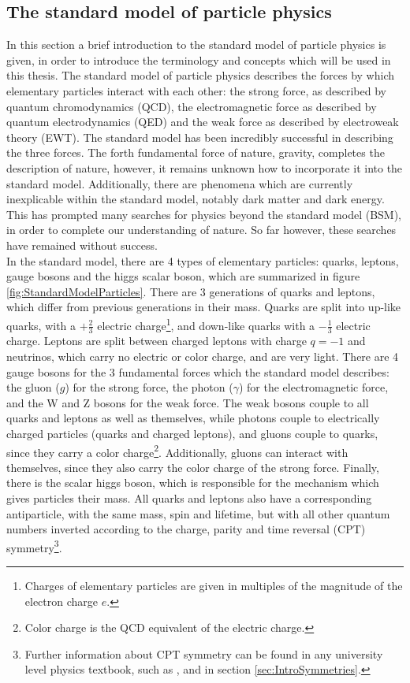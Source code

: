 \subsection{The standard model of particle physics}
In this section a brief introduction to the standard model of particle physics is given, in order to introduce the terminology and concepts which will be used in this thesis. 
The standard model of particle physics describes the forces by which elementary particles interact with each other: the strong force, as described by quantum chromodynamics (QCD), the electromagnetic force as described by quantum electrodynamics (QED) and the weak force as described by electroweak theory (EWT). The standard model has been incredibly successful in describing the three forces. The forth fundamental force of nature, gravity, completes the description of nature, however, it remains unknown how to incorporate it into the standard model. Additionally, there are phenomena which are currently inexplicable within the standard model, notably dark matter and dark energy. This has prompted many searches for physics beyond the standard model (BSM), in order to complete our understanding of nature. So far however, these searches have remained without success. \\

In the standard model, there are 4 types of elementary particles: quarks, leptons, gauge bosons and the higgs scalar boson, which are summarized in figure \ref{fig:StandardModelParticles}. There are 3 generations of quarks and leptons, which differ from previous generations in their mass. Quarks are split into up-like quarks, with a $+\frac{2}{3}$ electric charge\footnote{Charges of elementary particles are given in multiples of the magnitude of the electron charge $e$.}, and down-like quarks with a $-\frac{1}{3}$ electric charge. Leptons are split between charged leptons with charge $q=-1$ and neutrinos, which carry no electric or color charge, and are very light. There are 4 gauge bosons for the 3 fundamental forces which the standard model describes: the gluon ($g$) for the strong force, the photon ($\gamma$) for the electromagnetic force, and the W and Z bosons for the weak force. The weak bosons couple to all quarks and leptons as well as themselves, while photons couple to electrically charged particles (quarks and charged leptons), and gluons couple to quarks, since they carry a color charge\footnote{Color charge is the QCD equivalent of the electric charge.}. Additionally, gluons can interact with themselves, since they also carry the color charge of the strong force.
Finally, there is the scalar higgs boson, which is responsible for the mechanism which gives particles their mass.
All quarks and leptons also have a corresponding antiparticle, with the same mass, spin and lifetime, but with all other quantum numbers inverted according to the charge, parity and time reversal (CPT) symmetry\footnote{Further information about CPT symmetry can be found in any university level physics textbook, such as \cite{}, and in section \ref{sec:IntroSymmetries}.}. \\

